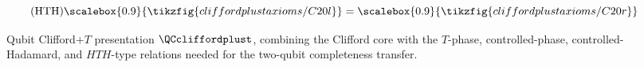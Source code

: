 \begin{figure}[ht]
{\begin{minipage}{0.975\textwidth}
        \begin{minipage}[c]{0.65\textwidth}
            \centering
            \begin{equation}\tag{HTH}\label{t-C20}
                \scalebox{0.9}{\tikzfig{cliffordplustaxioms/C20l}} = \scalebox{0.9}{\tikzfig{cliffordplustaxioms/C20r}}
            \end{equation}
        \end{minipage}
    \end{minipage}}
    \caption{Qubit Clifford\(+T\) presentation \(\QCcliffordplust\), combining the Clifford core with the \(T\)-phase, controlled-phase, controlled-Hadamard, and \(HTH\)-type relations needed for the two-qubit completeness transfer.}
    \label{fig:qubitcliffordplustaxioms}
\end{figure}
